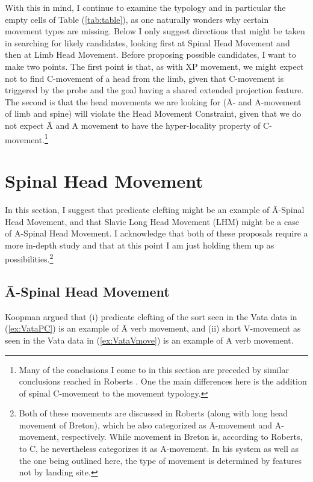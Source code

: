 \documentclass[output=paper,colorlinks,citecolor=brown,
]{langscibook}
\begin{document}
With this in mind, I continue to examine the typology and in particular the empty cells of Table (\ref{tab:table}), as one naturally wonders why certain movement types are missing.  Below I only suggest directions that might be taken in searching for likely candidates, looking first at Spinal Head Movement and then at Limb Head Movement.  Before proposing possible candidates, I want to make two points.  The first point is that, as with XP movement, we might  expect not to find C-movement of a head from the limb, given that C-movement is triggered by the probe and the goal having a shared extended projection feature. The second is that the head movements we are looking for (\=A- and A-movement of limb and spine) will violate the Head Movement Constraint, given that we do not expect  \=A and A movement to have the hyper-locality property of C-movement.\footnote{Many of the conclusions I come to in this section are preceded by similar conclusions reached in Roberts \citeyearpar{Roberts:2010}.  One the main differences here is the  addition of spinal C-movement to the movement typology.}
 
\section{Spinal Head Movement}

In this section, I suggest that predicate clefting might be an example of \=A-Spinal Head Movement, and that Slavic Long Head Movement (LHM) might be a case of A-Spinal Head Movement.  I acknowledge that both of these proposals require a more in-depth study and that at this point I am just holding them up as possibilities.\footnote{Both of these movements are discussed in Roberts \citeyearpar{Roberts:2010} (along with long head movement of Breton), which he also categorized as \=A-movement and A-movement, respectively.  While movement in Breton is, according to Roberts, to C, he nevertheless categorizes it as A-movement.  In his system as well as the one being outlined here, the type of movement is determined by features not by landing site.}


\subsection{\=A-Spinal Head Movement}

Koopman \citeyearpar{Koopman:1984} argued that (i) predicate clefting of the sort seen in the Vata data in (\ref{ex:VataPC})   is an example of \=A verb movement, and (ii) short V-movement as seen in the Vata data in   (\ref{ex:VataVmove}) is an example of A verb movement.  
\end{document}
